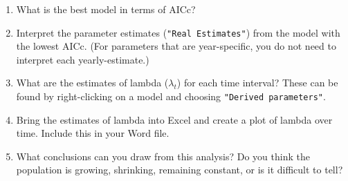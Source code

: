 \documentclass[12pt]{article}
\begin{document}
\begin{enumerate}
  \item What is the best model in terms of AICc?
  \item Interpret the parameter estimates (\verb+"Real Estimates"+)
    from the model with the lowest AICc. (For parameters that are
    year-specific, you do not need to interpret each yearly-estimate.)
  \item What are the estimates of lambda ($\lambda_t$) for each time
    interval? These can be found by right-clicking on a model and
    choosing \verb+"Derived parameters"+.
  \item Bring the estimates of lambda into Excel and create a plot of
    lambda over time. Include this in your Word file.
  \item What conclusions can you draw from
    this analysis? Do you think the population is growing, shrinking,
    remaining constant, or is it difficult to tell?
\end{enumerate}





\end{document}
